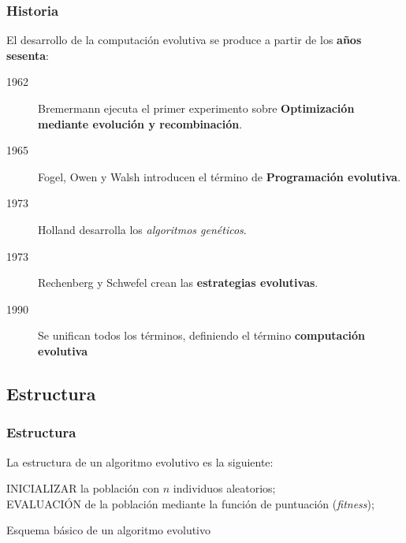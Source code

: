 \documentclass{beamer}
\begin{document}
\begin{frame}
\frametitle{Historia}

El desarrollo de la computación evolutiva se produce a partir de los \textbf{años sesenta}:

\begin{description}
    \item[1962] Bremermann ejecuta el primer experimento sobre \textbf{Optimización mediante evolución y recombinación}.
    \item[1965] Fogel, Owen y Walsh introducen el término de \textbf{Programación evolutiva}.
    \item[1973] Holland desarrolla los \textit{algoritmos genéticos}.
    \item[1973] Rechenberg y Schwefel crean las \textbf{estrategias evolutivas}.
    \item[1990] Se unifican todos los términos, definiendo el término \textbf{computación evolutiva}
\end{description}

\end{frame}

\subsection{Estructura}

\begin{frame}
\frametitle{Estructura}

La estructura de un algoritmo evolutivo es la siguiente:

\begin{algorithm}[H]
 INICIALIZAR la población con $n$ individuos aleatorios;\\
 EVALUACIÓN de la población mediante la función de puntuación (\textit{fitness});
 
 \caption{Esquema básico de un algoritmo evolutivo}
\end{algorithm}

\end{frame}
\end{document}
